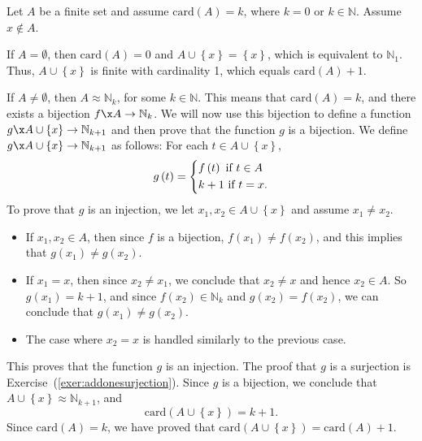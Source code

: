 \begin{myproof}
Let $A$ be a finite set and assume $\text{card}( A ) = k$, where 
$k = 0$ or $k \in \mathbb{N}$.  Assume $x \notin A$.

If $A = \emptyset$, then $\text{card}( A ) = 0$ and 
$A \cup \left\{ x \right\} = \left\{ x \right\}$, which is equivalent to $\mathbb{N}_1$.  Thus, 
$A \cup \left\{ x \right\}$ is finite with cardinality 1, which equals 
$\text{card}( A ) + 1$.

If $A \ne \emptyset$, then $A \approx \mathbb{N}_k$, for some $k \in \mathbb{N}$.  This means that $\text{card}( A ) = k$, and there exists a bijection $f\x A \to \mathbb{N}_k$.  We will now use this bijection to define a function $g\x A \cup \left\{ x \right\} \to \mathbb{N}_{k+1}$ and then prove that the function $g$ is a bijection.  We define $g\x A \cup \left\{ x \right\} \to \mathbb{N}_{k+1}$ as follows:  For each 
$t \in A \cup \left\{ x \right\}$,
\[
g \left( t \right) = \left\{ \begin{gathered}
  f \left( t \right) \text{  if  }t \in A \hfill \\
  k + 1 \text{  if  }t = x. \hfill \\ 
\end{gathered}  \right.
\]
To prove that $g$ is an injection, we let $x_1, x_2 \in A \cup \left\{ x \right\}$ and assume 
$x_1 \ne x_2$.
\begin{itemize}
\item If $x_1, x_2 \in A$, then since $f$ is a bijection, 
$f( x_1 ) \ne f ( x_2 )$, and this implies that 
$g( x_1 ) \ne g( x_2 )$.

\item If $x_1 = x$, then since $x_2 \ne x_1$, we conclude that $x_2 \ne x$ and hence 
$x_2 \in A$.  So $g( x_1 ) = k + 1$, and since $f( x_2 ) \in \mathbb{N}_k$ and 
$g( x_2 ) = f ( x_2 )$, we can conclude that $g( x_1 ) \ne g( x_2 )$.

\item The case where $x_2 = x$ is handled similarly to the previous case.
\end{itemize}

\noindent
This proves that the function $g$ is an injection.  The proof that $g$ is a surjection is 
Exercise~(\ref{exer:addonesurjection}).  Since $g$ is a bijection, we conclude that $A \cup \left\{ x \right\} \approx \mathbb{N}_{k+1}$, and
\[
\text{card} \!\left(A \cup \left\{ x \right\} \right) = k + 1.
\]
Since $\text{card} \left(A \right) = k$, we have proved that
$\text{card} \!\left(A \cup \left\{ x \right\} \right) = \text{card}( A ) + 1.$
\end{myproof}
%

